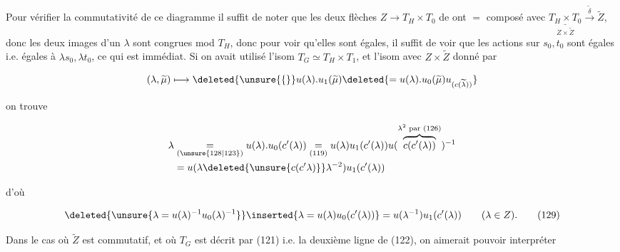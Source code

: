 


Pour vérifier la commutativité de ce diagramme il suffit de  noter que les  deux flèches  $Z\longrightarrow T_H\times T_0$ de  ont $=$ composé avec $\underset{Z\times\widetilde Z}{\underline{T_H\times T_0}}\xrightarrow{\widetilde\delta}\widetilde Z$, donc les deux images d'un $\lambda$ sont congrues mod $T_H$, donc pour voir qu'elles sont égales, il suffit de voir que les  actions sur $s_0,t_0$ sont égales i.e. égales à $\lambda s_0,\lambda t_0$, ce qui est immédiat. Si on avait utilisé l'isom $T_G\simeq T_H\times T_1$, et l'isom avec $Z\times\widetilde Z$ donné par

\[(\lambda,\widetilde\mu)\longmapsto\deleted{\unsure{\{} }u(\lambda).u_1(\widetilde\mu)\deleted{=u(\lambda).u_0(\widetilde\mu)u_{(c(\widetilde\lambda))}}\]

on trouve

\[\begin{aligned}
\lambda&\underset{(\unsure{128|123})}{=}u(\lambda).u_0(c'(\lambda))
\underset{(119)}{=}u(\lambda)u_1(c'(\lambda))u(\overbrace{c(c'(\lambda))}^{\lambda^2\text{ par }(126)})^{-1}\\
&=u(\lambda\deleted{\unsure{c(c'\lambda)}}\lambda^{-2})u_1(c'(\lambda))
\end{aligned}\]

d'où

\[\deleted{\unsure{\lambda=u(\lambda)^{-1}u_0(\lambda)^{-1}}}
\inserted{\lambda=u(\lambda)u_0(c'(\lambda))}
=u(\lambda^{-1})u_1(c'(\lambda))\qquad(\lambda\in Z).\tag*{(129)}\]

Dans le cas où $\widetilde Z$ est commutatif, et où $T_G$ est décrit par (121) i.e. la deuxième ligne de (122), on aimerait pouvoir interpréter

